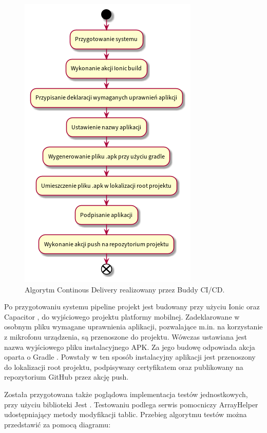 \begin{figure}[H]
	\begin{center}
		\includegraphics[scale=0.6]{media/ContinousDelivery.png}
	\end{center}
	\caption{Algorytm Continous Delivery realizowany przez Buddy CI/CD.}
	\label{rys:continous-delivery}
\end{figure}

Po przygotowaniu systemu pipeline projekt jest budowany przy użyciu Ionic \cite{ionic} oraz Capacitor \cite{capacitor},
do wyjściowego projektu platformy mobilnej.
Zadeklarowane w osobnym pliku wymagane uprawnienia aplikacji, pozwalające m.in. na korzystanie z mikrofonu urządzenia, są
przenoszone do projektu. Wówczas ustawiana jest nazwa wyjściowego pliku instalacyjnego APK.
Za jego budowę odpowiada akcja oparta o Gradle \cite{gradle}. Powstały w ten sposób instalacyjny aplikacji
jest przenoszony do lokalizacji root projektu, podpisywany certyfikatem oraz publikowany na repozytorium GitHub \cite{github}
przez akcję push.

Została przygotowana także poglądowa implementacja testów jednostkowych, przy użyciu biblioteki Jest \cite{jest}.
Testowaniu podlega serwis pomocniczy ArrayHelper udostępniający metody modyfikacji tablic.
Przebieg algorytmu testów można przedstawić za pomocą diagramu:


